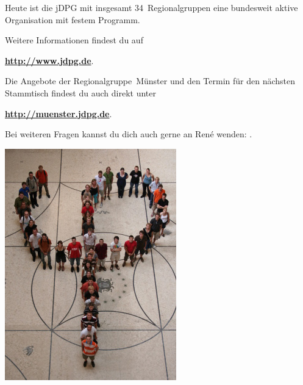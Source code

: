 \begin{multicols}{2}
Heute ist die jDPG mit insgesamt 34~Regionalgruppen eine bundesweit aktive Organisation mit festem Programm.

Weitere Informationen findest du auf
\begin{center}
	\textbf{\url{http://www.jdpg.de}}.
\end{center}

Die Angebote der Regionalgruppe~Münster und den Termin für den nächsten Stammtisch findest du auch direkt unter
\begin{center}
	\textbf{\url{http://muenster.jdpg.de}}.
\end{center}

Bei weiteren Fragen kannst du dich auch gerne an René wenden:
\textbf{}.

\begin{center}
	\includegraphics[width=\columnwidth]{res/jdpg_foto.png}
\end{center}

\end{multicols}

